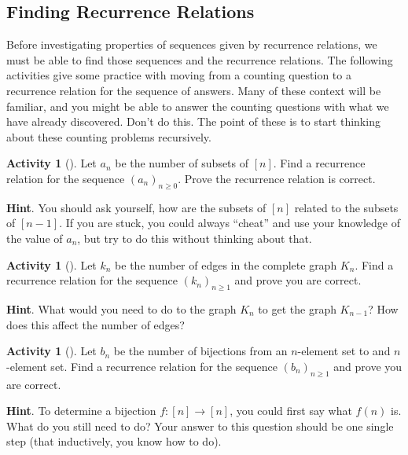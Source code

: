 \documentclass[10pt,]{book}
\theoremstyle{plain}
\theoremstyle{definition}
\theoremstyle{definition}
\theoremstyle{definition}
\newtheorem{activity}[project]{Activity}
\numberwithin{equation}{chapter}
\begin{document}
\subsection[{Finding Recurrence Relations}]{Finding Recurrence Relations}\label{subsec-recursionfinding}
\hypertarget{p-893}{}%
Before investigating properties of sequences given by recurrence relations, we must be able to find those sequences and the recurrence relations.  The following activities give some practice with moving from a counting question to a recurrence relation for the sequence of answers.  Many of these context will be familiar, and you might be able to answer the counting questions with what we have already discovered.  Don't do this.  The point of these is to start thinking about these counting problems recursively.%
\begin{activity}[]\label{activity-127}
\hypertarget{p-894}{}%
Let \(a_n\) be the number of subsets of \([n]\).  Find a recurrence relation for the sequence \((a_n)_{n \ge 0}\).  Prove the recurrence relation is correct.%
\par\smallskip%
\noindent\textbf{Hint}.\hypertarget{hint-92}{}\quad%
\hypertarget{p-895}{}%
You should ask yourself, how are the subsets of \([n]\) related to the subsets of \([n-1]\).  If you are stuck, you could always ``cheat'' and use your knowledge of the value of \(a_n\), but try to do this without thinking about that.%
\end{activity}
\begin{activity}[]\label{activity-128}
\hypertarget{p-896}{}%
Let \(k_n\) be the number of edges in the complete graph \(K_n\).  Find a recurrence relation for the sequence \((k_n)_{n \ge 1}\) and prove you are correct.%
\par\smallskip%
\noindent\textbf{Hint}.\hypertarget{hint-93}{}\quad%
\hypertarget{p-897}{}%
What would you need to do to the graph \(K_n\) to get the graph \(K_{n-1}\)?  How does this affect the number of edges?%
\end{activity}
\begin{activity}[]\label{activity-129}
\hypertarget{p-898}{}%
Let \(b_n\) be the number of bijections from an \(n\)-element set to and \(n\)-element set.  Find a recurrence relation for the sequence \((b_n)_{n \ge 1}\) and prove you are correct.%
\par\smallskip%
\noindent\textbf{Hint}.\hypertarget{hint-94}{}\quad%
\hypertarget{p-899}{}%
To determine a bijection \(f:[n] \to [n]\), you could first say what \(f(n)\) is.  What do you still need to do?  Your answer to this question should be one single step (that inductively, you know how to do).%
\end{activity}
\end{document}
